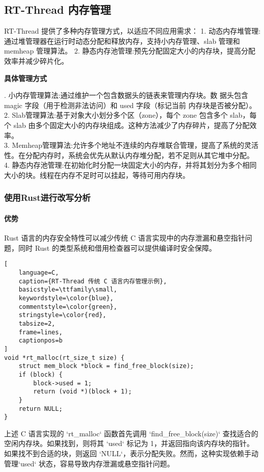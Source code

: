 \documentclass{ctexart}
\begin{document}
\subsection{RT-Thread 内存管理}
RT-Thread 提供了多种内存管理方式，以适应不同应用需求：
1. 动态内存堆管理:通过堆管理器在运行时动态分配和释放内存，支持小内存管理、slab 管理和 memheap 管理算法。
2. 静态内存池管理:预先分配固定大小的内存块，提高分配效率并减少碎片化。

\noindent \textbf{具体管理方式}

. 小内存管理算法:通过维护一个包含数据头的链表来管理内存块。数
据头包含 magic 字段（用于检测非法访问）和 used 字段（标记当前
内存块是否被分配）。\\
2. Slab管理算法:基于对象大小划分多个区（zone），每个 zone 包含多个 slab，每个 slab 由多个固定大小的内存块组成。这种方法减少了内存碎片，提高了分配效率。\\
3. Memheap管理算法:允许多个地址不连续的内存堆联合管理，提高了系统的灵活性。在分配内存时，系统会优先从默认内存堆分配，若不足则从其它堆中分配。\\
4. 静态内存池管理:在初始化时分配一块固定大小的内存，并将其划分为多个相同大小的块。线程在内存不足时可以挂起，等待可用内存块。\\
\subsubsection{使用Rust进行改写分析}
\paragraph{优势}
Rust 语言的内存安全特性可以减少传统 C 语言实现中的内存泄漏和悬空指针问题，同时 Rust 的类型系统和借用检查器可以提供编译时安全保障。

\begin{lstlisting}[
    language=C,
    caption={RT-Thread 传统 C 语言内存管理示例},
    basicstyle=\ttfamily\small,
    keywordstyle=\color{blue},
    commentstyle=\color{green},
    stringstyle=\color{red},
    tabsize=2,
    frame=lines,
    captionpos=b
]
void *rt_malloc(rt_size_t size) {
    struct mem_block *block = find_free_block(size);
    if (block) {
        block->used = 1;
        return (void *)(block + 1);
    }
    return NULL;
}
\end{lstlisting}

\noindent 上述 C 语言实现的 `rt\_malloc` 函数首先调用 `find\_free\_block(size)` 查找适合的空闲内存块。如果找到，则将其 `used` 标记为 1，并返回指向该内存块的指针。如果找不到合适的块，则返回 `NULL`，表示分配失败。然而，这种实现依赖手动管理`used` 状态，容易导致内存泄漏或悬空指针问题。
\end{document}

